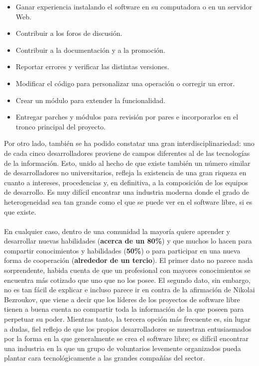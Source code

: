 \begin{itemize}
     \item Ganar experiencia instalando el software en su computadora o en un servidor Web. 
     \item Contribuir a los foros de discusión.
     \item Contribuir a la documentación y a la promoción.
     \item Reportar errores y verificar las distintas versiones.
     \item Modificar el código para personalizar una operación o corregir un error.
     \item Crear un módulo para extender la funcionalidad.
     \item Entregar parches y módulos para revisión por pares e incorporarlos en el tronco principal del proyecto.
\end{itemize}
Por otro lado, también se ha podido constatar una gran interdisciplinariedad: uno de cada cinco desarrolladores proviene de campos diferentes al de las tecnologías de la información. Esto, unido al hecho de que existe también un número similar de desarrolladores no universitarios, refleja la existencia de una gran riqueza en cuanto a intereses, procedencias y, en definitiva, a la composición de los equipos de desarrollo. Es muy difícil encontrar una industria moderna donde el grado de heterogeneidad sea tan grande como el que se puede ver en el software libre, si es que existe.
\\
\\
En cualquier caso, dentro de una comunidad la mayoría quiere aprender y desarrollar nuevas habilidades ({\bf acerca de un 80\%}) y que muchos lo hacen para compartir conocimientos y habilidades ({\bf 50\%}) o para participar en una nueva forma de cooperación ({\bf alrededor de un tercio}). El primer dato no parece nada sorprendente, habida cuenta de que un profesional con mayores conocimientos se encuentra más cotizado que uno que no los posee. El segundo dato, sin embargo, no es tan fácil de explicar e incluso parece ir en contra de la afirmación de Nikolai Bezroukov, que viene a decir que los líderes de los proyectos de software libre tienen a buena cuenta no compartir toda la información de la que poseen para perpetuar su poder. Mientras tanto, la tercera opción más frecuente es, sin lugar a dudas, fiel reflejo de que los propios desarrolladores se muestran entusiasmados por la forma en la que generalmente se crea el software libre; es difícil encontrar una industria en la que un grupo de voluntarios levemente organizados pueda plantar cara tecnológicamente a las grandes compañías del sector.
